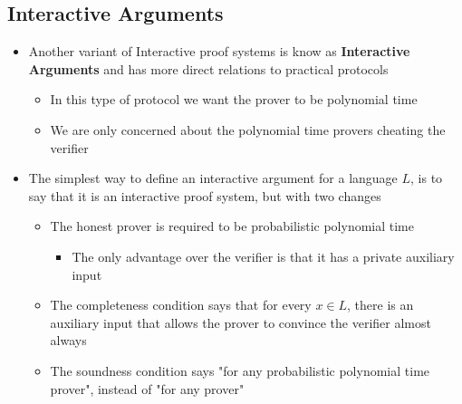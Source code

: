 \subsection{Interactive Arguments}
\begin{itemize}
  \item Another variant of Interactive proof systems is know as \textbf{Interactive Arguments} and has more direct relations to practical protocols
  \begin{itemize}
  	\item In this type of protocol we want the prover to be polynomial time
  	\item We are only concerned about the polynomial time provers cheating the verifier
  \end{itemize}

  \item The simplest way to define an interactive argument for a language $L$, is to say that it is an interactive proof system, but with two changes
  \begin{itemize}
  	\item The honest prover is required to be probabilistic polynomial time
    \begin{itemize}
  		\item The only advantage over the verifier is that it has a private auxiliary input
    \end{itemize}
  	\item The completeness condition says that for every $x \in L$, there is an auxiliary input that allows the prover to convince the verifier almost always
  	\item The soundness condition says "for any probabilistic polynomial time prover", instead of "for any prover"
  \end{itemize}
\end{itemize}

